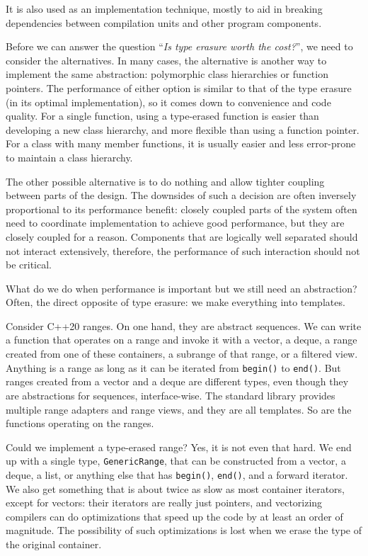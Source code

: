 {It is also used as an implementation technique, mostly to aid in breaking dependencies between compilation units and other program components.

Before we can answer the question ``\emph{Is type erasure worth the cost?}'', we need to consider the alternatives. In many cases, the alternative is another way to implement the same abstraction: polymorphic class hierarchies or function pointers. The performance of either option is similar to that of the type erasure (in its optimal implementation), so it comes down to convenience and code quality. For a single function, using a type-erased function is easier than developing a new class hierarchy, and more flexible than using a function pointer. For a class with many member functions, it is usually easier and less error-prone to maintain a class hierarchy.

The other possible alternative is to do nothing and allow tighter coupling between parts of the design. The downsides of such a decision are often inversely proportional to its performance benefit: closely coupled parts of the system often need to coordinate implementation to achieve good performance, but they are closely coupled for a reason. Components that are logically well separated should not interact extensively, therefore, the performance of such interaction should not be critical.

What do we do when performance is important but we still need an abstraction? Often, the direct opposite of type erasure: we make everything into templates.

Consider C++20 ranges. On one hand, they are abstract sequences. We can write a function that operates on a range and invoke it with a vector, a deque, a range created from one of these containers, a subrange of that range, or a filtered view. Anything is a range as long as it can be iterated from \texttt{begin()} to \texttt{end()}. But ranges created from a vector and a deque are different types, even though they are abstractions for sequences, interface-wise. The standard library provides multiple range adapters and range views, and they are all templates. So are the functions operating on the ranges.

Could we implement a type-erased range? Yes, it is not even that hard. We end up with a single type, \texttt{GenericRange}, that can be constructed from a vector, a deque, a list, or anything else that has \texttt{begin()}, \texttt{end()}, and a forward iterator. We also get something that is about twice as slow as most container iterators, except for vectors: their iterators are really just pointers, and vectorizing compilers can do optimizations that speed up the code by at least an order of magnitude. The possibility of such optimizations is lost when we erase the type of the original container.

}
